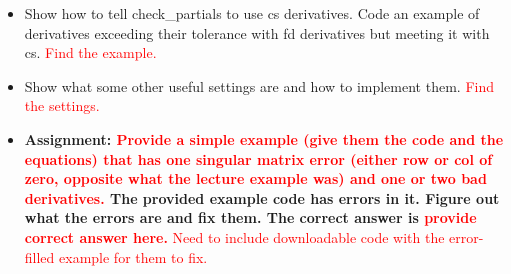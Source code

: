 \documentclass[12pt, letterpaper]{article}
\begin{document}
\begin{itemize}
\begin{itemize}
			\item Show how to tell check\_partials to use cs derivatives. Code an example of derivatives exceeding their tolerance with fd derivatives but meeting it with cs. \textcolor{red}{Find the example.}
			\item Show what some other useful settings are and how to implement them. \textcolor{red}{Find the settings.}
			\item \textbf{Assignment: \textcolor{red}{Provide a simple example (give them the code and the equations) that has one singular matrix error (either row or col of zero, opposite what the lecture example was) and one or two bad derivatives.} The provided example code has errors in it. Figure out what the errors are and fix them. The correct answer is \textcolor{red}{provide correct answer here.}} \textcolor{red}{Need to include downloadable code with the error-filled example for them to fix.}
		\end{itemize}
		

\end{itemize}
\end{document}
